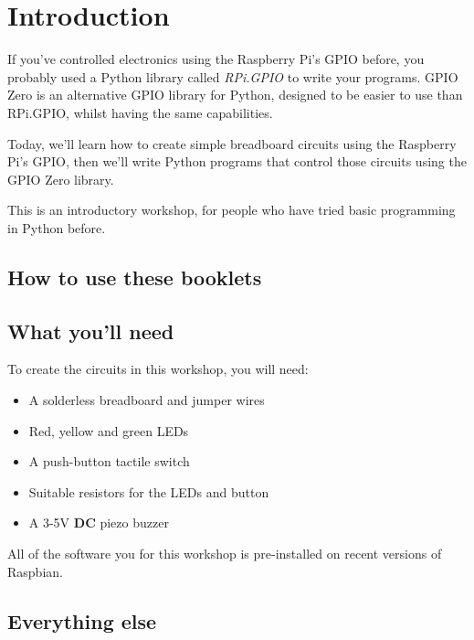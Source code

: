 \setcounter{section}{-1}
\section{Introduction}

	If you've controlled electronics using the Raspberry Pi's GPIO before, you probably used a Python library called \textit{RPi.GPIO} to write your programs. GPIO Zero is an alternative GPIO library for Python, designed to be easier to use than RPi.GPIO, whilst having the same capabilities.

	Today, we'll learn how to create simple breadboard circuits using the Raspberry Pi's GPIO, then we'll write Python programs that control those circuits using the GPIO Zero library.

	This is an introductory workshop, for people who have tried basic programming in Python before.
		
	\subsection*{How to use these booklets}

	
	
	
	

		
	\subsection*{What you'll need}
	
	To create the circuits in this workshop, you will need:
	
	\begin{itemize}[nosep]
		\item A solderless breadboard and jumper wires
		\item Red, yellow and green LEDs
		\item A push-button tactile switch
		\item Suitable resistors for the LEDs and button
		\item A 3-5V \textbf{DC} piezo buzzer
	\end{itemize}
	
	\ifprint\else All of the software you for this workshop is pre-installed on recent versions of Raspbian. \fi
		
	\subsection*{Everything else}
	
